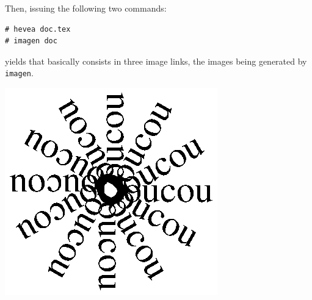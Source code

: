 Then, issuing the following two commands:
\begin{verbatim}
# hevea doc.tex
# imagen doc
\end{verbatim}
yields \html{} that basically consists in three image links,
the images being generated by \texttt{imagen}.
\ifhevea
\begin{htmlout}
\begin{center}
\includegraphics{round.ps}
\end{center}
\end{htmlout}
\fi

